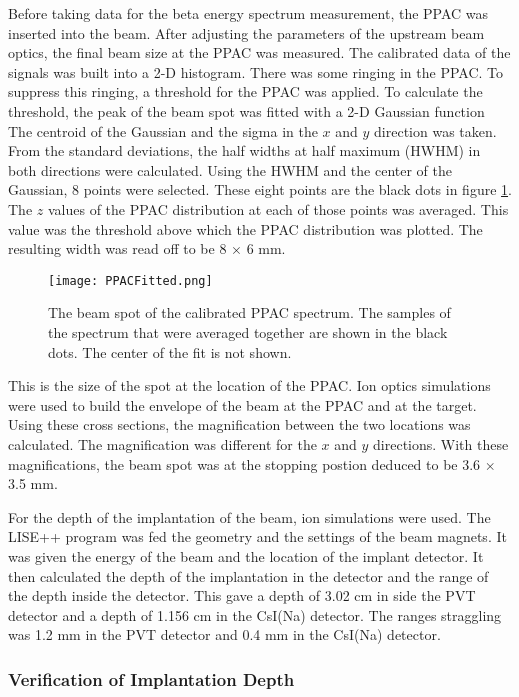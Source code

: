 \documentclass[../MaxHughesThesis.tex]{subfiles}
\begin{document}
Before taking data for the beta energy spectrum measurement, the PPAC was inserted into the beam.
After adjusting the parameters of the upstream beam optics, the final beam size at the PPAC was measured.
The calibrated data of the signals was built into a 2-D histogram.
There was some ringing in the PPAC.
To suppress this ringing, a threshold for the PPAC was applied. 
To calculate the threshold, the peak of the beam spot was fitted with a 2-D Gaussian function
The centroid of the Gaussian and the sigma in the $x$ and $y$ direction was taken. 
From the standard deviations, the half widths at half maximum (HWHM) in both directions were calculated. 
Using the HWHM and the center of the Gaussian, 8 points were selected.
These eight points are the black dots in figure \ref{fig:PPACSpotch}.
The $z$ values of the PPAC distribution at each of those points was averaged.
This value was the threshold above which the PPAC distribution was plotted.  
The resulting width was read off to be 8 $\times$ 6 mm.

\begin{figure}
	\centerline{\texttt{[image: PPACFitted.png]}}
	\caption{The beam spot of the calibrated PPAC spectrum. 
		 The samples of the spectrum that were averaged together are shown in the black dots.
		 The center of the fit is not shown.}
	\label{fig:PPACSpotch}
\end{figure}  

This is the size of the spot at the location of the PPAC. 
Ion optics simulations were used to build the envelope of the beam at the PPAC and at the target.
Using these cross sections, the magnification between the two locations was calculated.
The magnification was different for the $x$ and $y$ directions.
With these magnifications, the beam spot was at the stopping postion deduced to be 3.6 $\times$ 3.5 mm.  

For the depth of the implantation of the beam, ion simulations were used. 
The LISE++ program was fed the geometry and the settings of the beam magnets. 
It was given the energy of the beam and the location of the implant detector. 
It then calculated the depth of the implantation in the detector and the range of the depth inside the detector. 
This gave a depth of 3.02 cm in side the PVT detector and a depth of 1.156 cm in the CsI(Na) detector. 
The ranges straggling was 1.2 mm in the PVT detector and 0.4 mm in the CsI(Na) detector.

\subsubsection{Verification of Implantation Depth}
\end{document}
